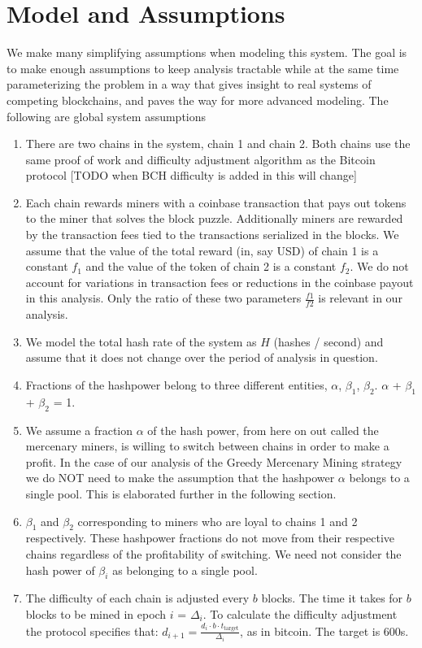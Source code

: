 \documentclass[10pt, preprint]{aastex}
\begin{document}
\section{Model and Assumptions}
We make many simplifying assumptions when modeling this system.  The goal is to make enough assumptions to keep analysis tractable while at the same time parameterizing the problem in a way that gives insight to real systems of competing blockchains, and paves the way for more advanced modeling.  The following are global system assumptions 
\begin{enumerate}
\item
There are two chains in the system, chain 1 and chain 2.  Both chains use the same proof of work and difficulty adjustment algorithm as the Bitcoin protocol [TODO when BCH difficulty is added in this will change]
\item
Each chain rewards miners with a coinbase transaction that pays out tokens to the miner that solves the block puzzle.  Additionally miners are rewarded by the transaction fees tied to the transactions serialized in the blocks.  We assume that the value of the total reward (in, say USD) of chain 1 is a constant $f_1$ and the value of the token of chain 2 is a constant $f_2$.  We do not account for variations in transaction fees or reductions in the coinbase payout in this analysis.  Only the ratio of these two parameters $\frac{f1}{f2}$ is relevant in our analysis.
\item
We model the total hash rate of the system as $H$ (hashes / second) and assume that it does not change over the period of analysis in question.  
\item
Fractions of the hashpower belong to three different entities, $\alpha$, $\beta_1$, $\beta_2$.  $\alpha$ + $\beta_1$ + $\beta_2$ = 1.
\item
We assume a fraction $\alpha$ of the hash power, from here on out called the mercenary miners, is willing to switch between chains in order to make a profit.  In the case of our analysis of the Greedy Mercenary Mining strategy we do NOT need to make the assumption that the hashpower $\alpha$ belongs to a single pool.  This is elaborated further in the following section.
\item
$\beta_1$ and $\beta_2$ corresponding to miners who are loyal to chains 1 and 2 respectively.  These hashpower fractions do not move from their respective chains regardless of the profitability of switching.  We need not consider the hash power of $\beta_i$ as belonging to a single pool.
\item
The difficulty of each chain is adjusted every $b$ blocks.  The time it takes for $b$ blocks to be mined in epoch $i$ = $\Delta_i$.  To calculate the difficulty adjustment the protocol specifies that: $d_{i+1} = \frac{ d_i \cdot b \cdot t_{\text{target}} }{ \Delta_i}$, as in bitcoin.  The target is 600s.


\end{enumerate}
\end{document}
